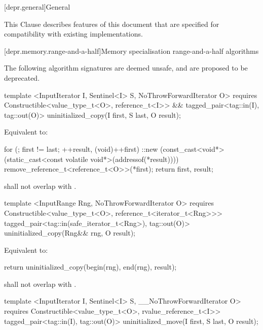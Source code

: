 
[depr.general]{General}

\pnum
This Clause describes features of this document that are specified for compatibility with existing
implementations.

[depr.memory.range-and-a-half]{Memory specialisation range-and-a-half algorithms}
{\color{addclr}
\pnum
The following algorithm signatures are deemed unsafe, and are proposed to be deprecated.

\begin{codeblock}
template <InputIterator I, Sentinel<I> S, NoThrowForwardIterator O>
requires
  Constructible<value_type_t<O>, reference_t<I>> &&
tagged_pair<tag::in(I), tag::out(O)>
  uninitialized_copy(I first, S last, O result);
\end{codeblock}

\pnum
\effects Equivalent to:
\begin{codeblock}
    for (; first != last; ++result, (void)++first) {
      ::new (const_cast<void*>(static_cast<const volatile void*>(addressof(*result))))
        remove_reference_t<reference_t<O>>(*first);
    }
    return {first, result};
\end{codeblock}

\pnum
\requires {} shall not overlap with
.


\begin{codeblock}
template <InputRange Rng, NoThrowForwardIterator O>
  requires
Constructible<value_type_t<O>, reference_t<iterator_t<Rng>>>
  tagged_pair<tag::in(safe_iterator_t<Rng>), tag::out(O)>
uninitialized_copy(Rng&& rng, O result);
\end{codeblock}

\pnum
\effects Equivalent to:
\begin{codeblock}
   return uninitialized_copy(begin(rng), end(rng), result);
\end{codeblock}

\pnum
\requires {} shall not overlap with
.

\begin{codeblock}
template <InputIterator I, Sentinel<I> S, __NoThrowForwardIterator O>
  requires
Constructible<value_type_t<O>, rvalue_reference_t<I>>
  tagged_pair<tag::in(I), tag::out(O)>
uninitialized_move(I first, S last, O result);
\end{codeblock}

}

